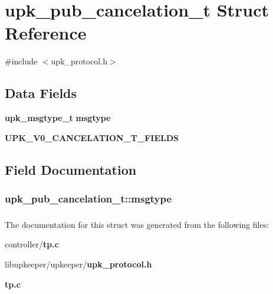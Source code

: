 \section{upk\_\-pub\_\-cancelation\_\-t Struct Reference}
\label{structupk__pub__cancelation__t}


{\ttfamily \#include $<$upk\_\-protocol.h$>$}

\subsection*{Data Fields}
\begin{DoxyCompactItemize}
\item 
{\bf upk\_\-msgtype\_\-t} {\bf msgtype}
\item 
{\bf UPK\_\-V0\_\-CANCELATION\_\-T\_\-FIELDS}
\end{DoxyCompactItemize}


\subsection{Field Documentation}
\subsubsection[{msgtype}]{ {\bf upk\_\-pub\_\-cancelation\_\-t::msgtype}}\label{structupk__pub__cancelation__t_aabd02c019a75ed8536a16b61269fae4f}
\subsubsection[{UPK\_\-V0\_\-CANCELATION\_\-T\_\-FIELDS}]{}\label{structupk__pub__cancelation__t_a6457691e1fbba6c131ff6f02f9dd3ff2}


The documentation for this struct was generated from the following files:\begin{DoxyCompactItemize}
\item 
controller/{\bf tp.c}\item 
libupkeeper/upkeeper/{\bf upk\_\-protocol.h}\item 
{\bf tp.c}\end{DoxyCompactItemize}
